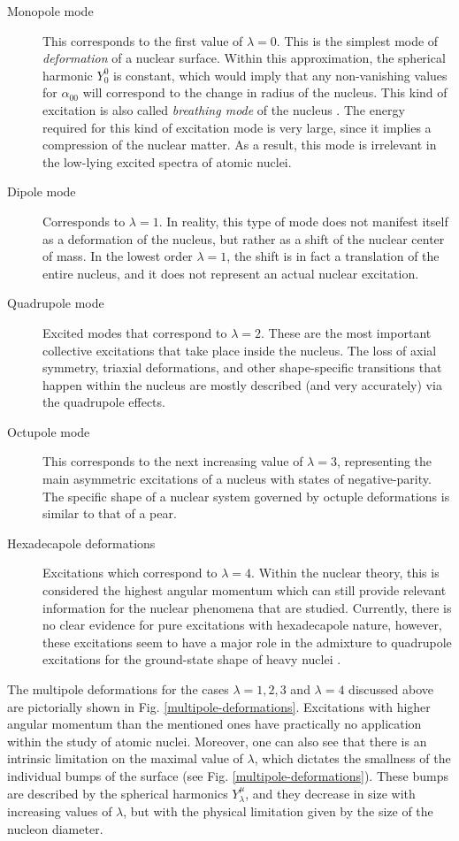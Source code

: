 \begin{description}
    \item[Monopole mode] This corresponds to the first value of $\lambda=0$. This is the simplest mode of \emph{deformation} of a nuclear surface. Within this approximation, the spherical harmonic $Y_0^0$ is constant, which would imply that any non-vanishing values for $\alpha_{00}$ will correspond to the change in radius of the nucleus. This kind of excitation is also called \emph{breathing mode} of the nucleus \cite{greiner1996nuclear,bohr1998nuclear}. The energy required for this kind of excitation mode is very large, since it implies a compression of the nuclear matter. As a result, this mode is irrelevant in the low-lying excited spectra of atomic nuclei.
    \item[Dipole mode] Corresponds to $\lambda=1$. In reality, this type of mode does not manifest itself as a deformation of the nucleus, but rather as a shift of the nuclear center of mass. In the lowest order $\lambda=1$, the shift is in fact a translation of the entire nucleus, and it does not represent an actual nuclear excitation.
    \item[Quadrupole mode] Excited modes that correspond to $\lambda=2$. These are the most important collective excitations that take place inside the nucleus. The loss of axial symmetry, triaxial deformations, and other shape-specific transitions that happen within the nucleus are mostly described (and very accurately) via the quadrupole effects.
    \item[Octupole mode] This corresponds to the next increasing value of $\lambda=3$, representing the main asymmetric excitations of a nucleus with states of negative-parity. The specific shape of a nuclear system governed by octuple deformations is similar to that of a pear.
    \item[Hexadecapole deformations] Excitations which correspond to $\lambda=4$. Within the nuclear theory, this is considered the highest angular momentum which can still provide relevant information for the nuclear phenomena that are studied. Currently, there is no clear evidence for pure excitations with hexadecapole nature, however, these excitations seem to have a major role in the admixture to quadrupole excitations for the ground-state shape of heavy nuclei \cite{greiner1996nuclear}.
\end{description}
The multipole deformations for the cases $\lambda=1,2,3$ and $\lambda=4$ discussed above are pictorially shown in Fig. \ref{multipole-deformations}.
Excitations with higher angular momentum than the mentioned ones have practically no application within the study of atomic nuclei. Moreover, one can also see that there is an intrinsic limitation on the maximal value of $\lambda$, which dictates the smallness of the individual bumps of the surface (see Fig. \ref{multipole-deformations}). These bumps are described by the spherical harmonics $Y_\lambda^\mu$, and they decrease in size with increasing values of $\lambda$, but with the physical limitation given by the size of the nucleon diameter.

